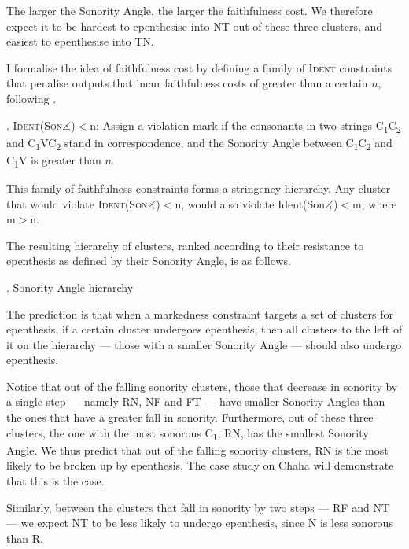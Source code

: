\documentclass[12pt]{article}
\begin{document}
The larger the {\sc Sonority Angle}, the larger the faithfulness cost. We therefore expect it to be hardest to epenthesise into NT out of these three clusters, and easiest to epenthesise into TN.

I formalise the idea of faithfulness cost by defining a family of \textsc{Ident} constraints that penalise outputs that incur faithfulness costs of greater than a certain $n$, following \cite{flemming.2008}.

\ex. \textsc{Ident(Son$\measuredangle$)}$<$n: Assign a violation mark if the consonants in two strings C\textsubscript{1}C\textsubscript{2} and C\textsubscript{1}VC\textsubscript{2} 
stand in correspondence, and the {\sc Sonority Angle} between C\textsubscript{1}C\textsubscript{2} and C\textsubscript{1}V is greater than $n$.

This family of faithfulness constraints forms a stringency hierarchy. Any cluster that would violate \textsc{Ident(Son$\measuredangle$)}$<$n, would also violate {\sc Ident(Son$\measuredangle$)}$<$m, where m$>$n.

The resulting hierarchy of clusters, ranked according to their resistance to epenthesis as defined
by their {\sc Sonority Angle}, is as follows.
	
\ex. {\sc Sonority Angle} hierarchy

\vspace{-3em}
\noindent \resizebox{\linewidth}{!}{\usebox{\sonorityanglehierarchycompressednumbers}}

The prediction is that when a markedness constraint targets a set of clusters for epenthesis, if a certain cluster undergoes epenthesis, then all clusters to the left of it on the hierarchy --- those with a smaller {\sc Sonority Angle} --- should also undergo epenthesis.

Notice that out of the falling sonority clusters, those that decrease in sonority by a single step
--- namely RN, NF and FT --- have smaller {\sc Sonority Angles} than the ones that have a greater fall
in sonority. Furthermore, out of these three clusters, the one with the most sonorous C\textsubscript{1}, RN, has the smallest {\sc Sonority Angle}. We thus predict that out of the falling sonority clusters, RN is the most likely to be broken up by epenthesis. The case study on Chaha will demonstrate that this is the case.

Similarly, between the clusters that fall in sonority by two steps --- RF and NT --- we expect
NT to be less likely to undergo epenthesis, since N is less sonorous than R. 
\end{document}
